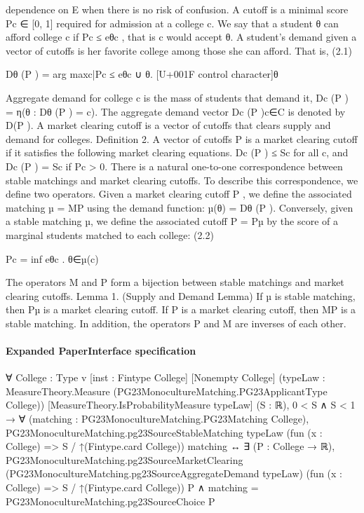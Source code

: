 \documentclass[10pt]{article}
\begin{document}
\begin{ReviewVerbatim}

dependence on E when there is no risk of confusion. A cutoff is a minimal score
Pc ∈ [0, 1] required for admission at a college c. We say that a student θ can afford
college c if Pc ≤ eθc , that is c would accept θ. A student’s demand given a vector of
cutoffs is her favorite college among those she can afford. That is,
(2.1)

Dθ (P ) = arg max{c|Pc ≤ eθc } ∪ {θ}.
[U+001F control character]θ

Aggregate demand for college c is the mass of students that demand it,
Dc (P ) = η({θ : Dθ (P ) = c}).
The aggregate demand vector {Dc (P )}c∈C is denoted by D(P ).
A market clearing cutoff is a vector of cutoffs that clears supply and demand for
colleges.
Definition 2. A vector of cutoffs P is a market clearing cutoff if it satisfies the
following market clearing equations.
Dc (P ) ≤ Sc
for all c, and Dc (P ) = Sc if Pc > 0.
There is a natural one-to-one correspondence between stable matchings and market
clearing cutoffs. To describe this correspondence, we define two operators. Given a
market clearing cutoff P , we define the associated matching µ = MP using the demand
function:
µ(θ) = Dθ (P ).
Conversely, given a stable matching µ, we define the associated cutoff P = Pµ by
the score of a marginal students matched to each college:
(2.2)

Pc = inf eθc .
θ∈µ(c)

The operators M and P form a bijection between stable matchings and market
clearing cutoffs.
Lemma 1. (Supply and Demand Lemma) If µ is stable matching, then Pµ is a
market clearing cutoff. If P is a market clearing cutoff, then MP is a stable matching.
In addition, the operators P and M are inverses of each other.
\end{ReviewVerbatim}



\paragraph{Expanded PaperInterface specification}
\begin{ReviewVerbatim}
∀ {College : Type v} [inst : Fintype College] [Nonempty College]
  (typeLaw : MeasureTheory.Measure (PG23MonocultureMatching.PG23ApplicantType College))
  [MeasureTheory.IsProbabilityMeasure typeLaw] (S : ℝ),
  0 < S ∧ S < 1 →
    ∀ (matching : PG23MonocultureMatching.PG23Matching College),
      PG23MonocultureMatching.pg23SourceStableMatching typeLaw (fun (x : College) => S / ↑(Fintype.card College))
          matching ↔
        ∃ (P : College → ℝ),
          PG23MonocultureMatching.pg23SourceMarketClearing (PG23MonocultureMatching.pg23SourceAggregateDemand typeLaw)
              (fun (x : College) => S / ↑(Fintype.card College)) P ∧
            matching = PG23MonocultureMatching.pg23SourceChoice P
\end{ReviewVerbatim}
\end{document}
